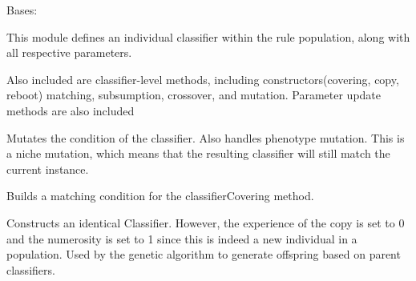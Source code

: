 \documentclass[letterpaper,10pt,english]{sphinxmanual}
\begin{document}
\begin{fulllineitems}
\label{\detokenize{eLCS:eLCS.Classifier.Classifier}}
Bases: 

This module defines an individual classifier within the rule population, along with all respective parameters.

Also included are classifier-level methods, including constructors(covering, copy, reboot)
matching, subsumption, crossover, and mutation.  Parameter update methods are also included

\begin{fulllineitems}
\label{\detokenize{eLCS:eLCS.Classifier.Classifier.Mutation}}
Mutates the condition of the classifier. Also handles phenotype mutation. This is a niche mutation, which means that the resulting classifier will still match the current instance.

\end{fulllineitems}


\begin{fulllineitems}
\label{\detokenize{eLCS:eLCS.Classifier.Classifier.buildMatch}}
Builds a matching condition for the classifierCovering method.

\end{fulllineitems}


\begin{fulllineitems}
\label{\detokenize{eLCS:eLCS.Classifier.Classifier.classifierCopy}}
Constructs an identical Classifier.  However, the experience of the copy is set to 0 and the numerosity 
is set to 1 since this is indeed a new individual in a population. Used by the genetic algorithm to generate 
offspring based on parent classifiers.

\end{fulllineitems}



\end{fulllineitems}
\end{document}
